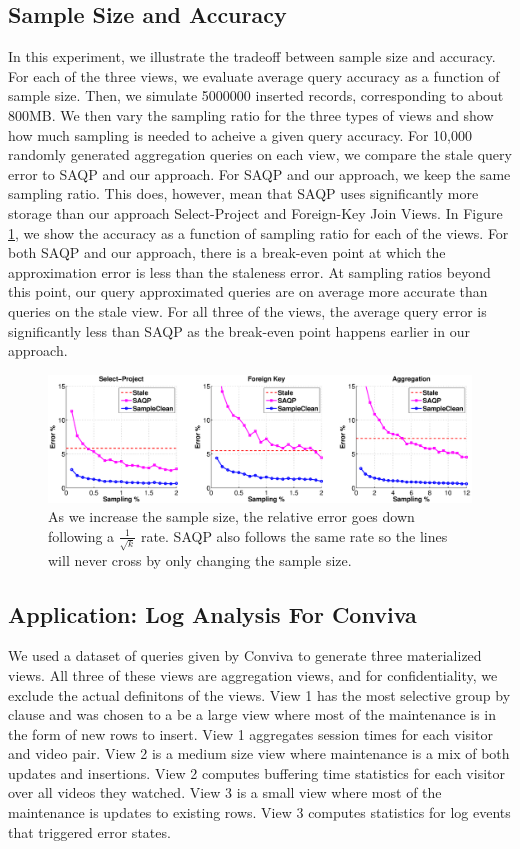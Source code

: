 \subsection{Sample Size and Accuracy}
In this experiment, we illustrate the tradeoff between sample size and accuracy.
For each of the three views, we evaluate average query accuracy as a function of sample size.
Then, we simulate 5000000 inserted records, corresponding to about 800MB.
We then vary the sampling ratio for the three types of views and show how much sampling is needed to acheive a given query accuracy.
For 10,000 randomly generated aggregation queries on each view, we compare the stale query error to SAQP and our approach.
For SAQP and our approach, we keep the same sampling ratio.
This does, however, mean that SAQP uses significantly more storage than our approach Select-Project and Foreign-Key Join Views.
In Figure \ref{exp1sample}, we show the accuracy as a function of sampling ratio for each of the views.
For both SAQP and our approach, there is a break-even point at which the approximation error is less than the staleness error.
At sampling ratios beyond this point, our query approximated queries are on average more accurate than queries on the stale view.
For all three of the views, the average query error is significantly less than SAQP as the break-even point happens earlier in our approach.

\begin{figure}[ht!]
\label{exp1sample}
\hspace{-3em}
 \includegraphics[scale=0.20]{exp/exp1-samplesize-accuracy.eps}
 \caption{As we increase the sample size, the relative error goes down following a $\frac{1}{\sqrt{k}}$ rate. SAQP also follows the same rate so the lines will never cross by only changing the sample size.}
\end{figure}

\subsection{Application: Log Analysis For Conviva}
We used a dataset of queries given by Conviva to generate three materialized views.
All three of these views are aggregation views, and for confidentiality, we exclude the actual definitons of the views. 
View 1 has the most selective group by clause and was chosen to a be a large view where most of the maintenance is in the form of new rows to insert.
View 1 aggregates session times for each visitor and video pair.
View 2 is a medium size view where maintenance is a mix of both updates and insertions.
View 2 computes buffering time statistics for each visitor over all videos they watched.
View 3 is a small view where most of the maintenance is updates to existing rows.
View 3 computes statistics for log events that triggered error states.

